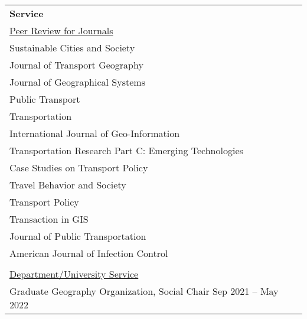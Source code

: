 \documentclass[letterpaper, 11pt]{article}
\begin{document}
\begin{longtable}{p{6.5in}}
\textbf{Service}\\
\underline{Peer Review for Journals}\\
Sustainable Cities and Society \\
Journal of Transport Geography \\
Journal of Geographical Systems \\
Public Transport \\
Transportation \\
International Journal of Geo-Information \\
Transportation Research Part C: Emerging Technologies \\ 
Case Studies on Transport Policy \\
Travel Behavior and Society \\
Transport Policy \\
Transaction in GIS \\
Journal of Public Transportation \\ 
American Journal of Infection Control \\\\


\underline{Department/University Service}\\
Graduate Geography Organization, Social Chair \hfill Sep 2021 -- May 2022\\


\end{longtable}
\end{document}
